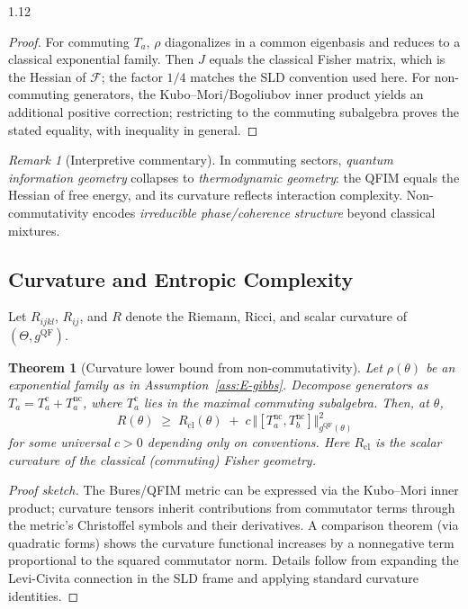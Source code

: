 \documentclass[12pt,a4paper]{article}
\numberwithin{equation}{section}
\newtheorem{theorem}{Theorem}[section]
\theoremstyle{remark}
\newtheorem{remark}{Remark}[section]
\theoremstyle{definition}
\begin{document}
\begin{spacing}{1.12}
\begin{proof}
For commuting $T_a$, $\rho$ diagonalizes in a common eigenbasis and reduces to a classical exponential family. Then $J$ equals the classical Fisher matrix, which is the Hessian of $\mathcal{F}$; the factor $1/4$ matches the SLD convention used here. For non-commuting generators, the Kubo--Mori/Bogoliubov inner product yields an additional positive correction; restricting to the commuting subalgebra proves the stated equality, with inequality in general.
\end{proof}

\begin{remark}[Interpretive commentary]
In commuting sectors, \emph{quantum information geometry} collapses to \emph{thermodynamic geometry}: the QFIM equals the Hessian of free energy, and its curvature reflects interaction complexity. Non-commutativity encodes \emph{irreducible phase/coherence structure} beyond classical mixtures.
\end{remark}

\subsection{Curvature and Entropic Complexity}\label{sec:E-curvature}

Let $R_{ijkl}$, $R_{ij}$, and $R$ denote the Riemann, Ricci, and scalar curvature of $(\Theta,g^{\mathrm{QF}})$.

\begin{theorem}[Curvature lower bound from non-commutativity]\label{thm:E-curvature-bound}
Let $\rho(\theta)$ be an exponential family as in Assumption~\ref{ass:E-gibbs}. Decompose generators as $T_a = T_a^{\mathrm{c}}+T_a^{\mathrm{nc}}$, where $T_a^{\mathrm{c}}$ lies in the maximal commuting subalgebra. Then, at $\theta$,
\[
R(\theta) \;\ge\; R_{\mathrm{cl}}(\theta) \;+\; c\,\big\Vert [T_a^{\mathrm{nc}},T_b^{\mathrm{nc}}]\big\Vert^2_{g^{\mathrm{QF}}(\theta)}
\]
for some universal $c>0$ depending only on conventions. Here $R_{\mathrm{cl}}$ is the scalar curvature of the classical (commuting) Fisher geometry.
\end{theorem}

\begin{proof}[Proof sketch]
The Bures/QFIM metric can be expressed via the Kubo--Mori inner product; curvature tensors inherit contributions from commutator terms through the metric's Christoffel symbols and their derivatives. A comparison theorem (via quadratic forms) shows the curvature functional increases by a nonnegative term proportional to the squared commutator norm. Details follow from expanding the Levi-Civita connection in the SLD frame and applying standard curvature identities.
\end{proof}


\end{spacing}
\end{document}
